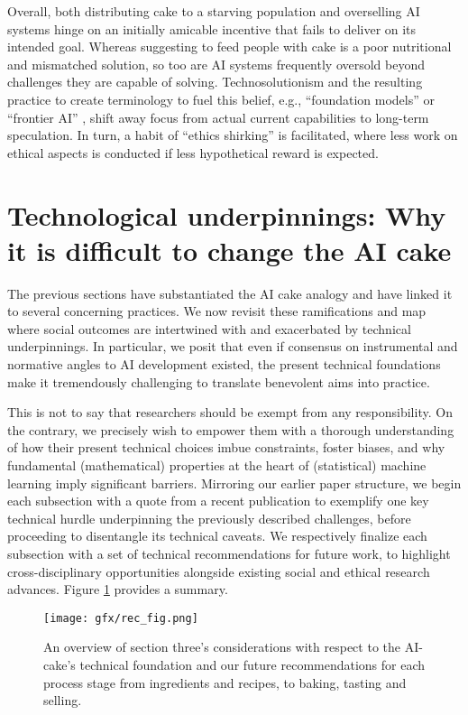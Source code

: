 \documentclass[manuscript,screen,authorversion,nonacm]{acmart}
\begin{document}
Overall, both distributing cake to a starving population and overselling AI systems hinge on an initially amicable incentive that fails to deliver on its intended goal. Whereas suggesting to feed people with cake is a poor nutritional and mismatched solution, so too are AI systems frequently oversold beyond challenges they are capable of solving. Technosolutionism and the resulting practice to create terminology to fuel this belief, e.g., ``foundation models'' or ``frontier AI'' \cite{Helfrich2024FrontierAIHarms}, shift away focus from actual current capabilities to long-term speculation. In turn, a habit of ``ethics shirking'' \cite{Floridi2019FiveRisksUnethical,Nasdaq2024Shirking} is facilitated, where less work on ethical aspects is conducted if less hypothetical reward is expected. 

\section{Technological underpinnings: Why it is difficult to change the AI cake}
The previous sections have substantiated the AI cake analogy and have linked it to several concerning practices. We now revisit these ramifications and map where social outcomes are intertwined with and exacerbated by technical underpinnings. In particular, we posit that even if consensus on instrumental and normative angles to AI development existed, the present technical foundations make it tremendously challenging to translate benevolent aims into practice. 

This is not to say that researchers should be exempt from any responsibility. On the contrary, we precisely wish to empower them with a thorough understanding of how their present technical choices imbue constraints, foster biases, and why fundamental (mathematical) properties at the heart of (statistical) machine learning imply significant barriers. Mirroring our earlier paper structure, we begin each subsection with a quote from a recent publication to exemplify one key technical hurdle underpinning the previously described challenges, before proceeding to disentangle its technical caveats. We respectively finalize each subsection with a set of technical recommendations for future work, to highlight cross-disciplinary opportunities alongside existing social and ethical research advances. Figure \ref{fig:recommendations} provides a summary.

\begin{figure}
    \centering
    \texttt{[image: gfx/rec\_fig.png]}
    \caption{An overview of section three's  considerations with respect to the AI-cake's technical foundation and our future recommendations for each process stage from ingredients and recipes, to baking, tasting and selling. 
    }
    \label{fig:recommendations}
\end{figure}
\end{document}
